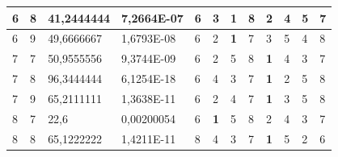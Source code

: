 \documentclass[conference]{IEEEtran}
\begin{document}
\begin{table}[]
\begin{tabular}{|llll|llllllll|}
		\multicolumn{1}{|l|}{6}   & \multicolumn{1}{l|}{8}         & \multicolumn{1}{l|}{41,2444444}    & 7,2664E-07 & \multicolumn{1}{l|}{6}   & \multicolumn{1}{l|}{3}          & \multicolumn{1}{l|}{\textbf{1}} & \multicolumn{1}{l|}{8}   & \multicolumn{1}{l|}{2}          & \multicolumn{1}{l|}{4}          & \multicolumn{1}{l|}{5}          & 7                      \\ \hline
		\multicolumn{1}{|l|}{6}   & \multicolumn{1}{l|}{9}         & \multicolumn{1}{l|}{49,6666667}    & 1,6793E-08 & \multicolumn{1}{l|}{6}   & \multicolumn{1}{l|}{2}          & \multicolumn{1}{l|}{\textbf{1}} & \multicolumn{1}{l|}{7}   & \multicolumn{1}{l|}{3}          & \multicolumn{1}{l|}{5}          & \multicolumn{1}{l|}{4}          & 8                      \\ \hline
		\multicolumn{1}{|l|}{7}   & \multicolumn{1}{l|}{7}         & \multicolumn{1}{l|}{50,9555556}    & 9,3744E-09 & \multicolumn{1}{l|}{6}   & \multicolumn{1}{l|}{2}          & \multicolumn{1}{l|}{5}          & \multicolumn{1}{l|}{8}   & \multicolumn{1}{l|}{\textbf{1}} & \multicolumn{1}{l|}{4}          & \multicolumn{1}{l|}{3}          & 7                      \\ \hline
		\multicolumn{1}{|l|}{7}   & \multicolumn{1}{l|}{8}         & \multicolumn{1}{l|}{96,3444444}    & 6,1254E-18 & \multicolumn{1}{l|}{6}   & \multicolumn{1}{l|}{4}          & \multicolumn{1}{l|}{3}          & \multicolumn{1}{l|}{7}   & \multicolumn{1}{l|}{\textbf{1}} & \multicolumn{1}{l|}{2}          & \multicolumn{1}{l|}{5}          & 8                      \\ \hline
		\multicolumn{1}{|l|}{7}   & \multicolumn{1}{l|}{9}         & \multicolumn{1}{l|}{65,2111111}    & 1,3638E-11 & \multicolumn{1}{l|}{6}   & \multicolumn{1}{l|}{2}          & \multicolumn{1}{l|}{4}          & \multicolumn{1}{l|}{7}   & \multicolumn{1}{l|}{\textbf{1}} & \multicolumn{1}{l|}{3}          & \multicolumn{1}{l|}{5}          & 8                      \\ \hline
		\multicolumn{1}{|l|}{8}   & \multicolumn{1}{l|}{7}         & \multicolumn{1}{l|}{22,6}          & 0,00200054 & \multicolumn{1}{l|}{6}   & \multicolumn{1}{l|}{\textbf{1}} & \multicolumn{1}{l|}{5}          & \multicolumn{1}{l|}{8}   & \multicolumn{1}{l|}{2}          & \multicolumn{1}{l|}{4}          & \multicolumn{1}{l|}{3}          & 7                      \\ \hline
		\multicolumn{1}{|l|}{8}   & \multicolumn{1}{l|}{8}         & \multicolumn{1}{l|}{65,1222222}    & 1,4211E-11 & \multicolumn{1}{l|}{8}   & \multicolumn{1}{l|}{4}          & \multicolumn{1}{l|}{3}          & \multicolumn{1}{l|}{7}   & \multicolumn{1}{l|}{\textbf{1}} & \multicolumn{1}{l|}{5}          & \multicolumn{1}{l|}{2}          & 6                      \\ \hline

\end{tabular}
\end{table}
\end{document}
